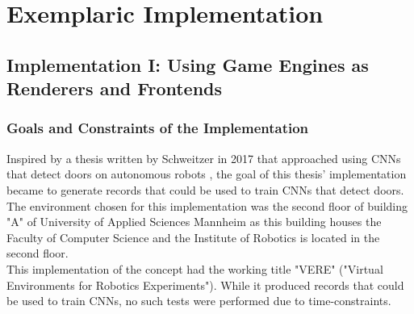 \chapter{Exemplaric Implementation}
\label{chap:implementations}

\section{Implementation I: Using Game Engines as Renderers and Frontends}
\subsection{Goals and Constraints of the Implementation}
\label{section:goals-and-constraints}
Inspired by a thesis written by Schweitzer in 2017 that approached using \acsp{CNN} that detect doors on autonomous robots \cite{Schweitzer2017}, the goal of this thesis' implementation became to generate records that could be used to train \acsp{CNN} that detect doors.\\ 
The environment chosen for this implementation was the second floor of building "A" of University of Applied Sciences Mannheim as this building houses the Faculty of Computer Science and the Institute of Robotics is located in the second floor.\\
This implementation of the concept had the working title "VERE" ("Virtual Environments for Robotics Experiments"). While it produced records that could be used to train \acsp{CNN}, no such tests were performed due to time-constraints.

